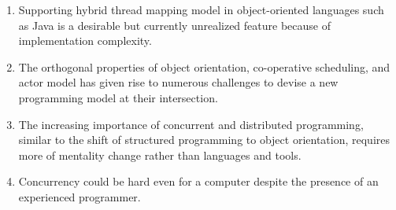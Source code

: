 \documentclass[a5paper,10pt]{article}
\begin{document}
\begin{enumerate}
\item Supporting hybrid thread mapping model in object-oriented languages
such as Java is a desirable but currently unrealized feature because of implementation
complexity.

\item The orthogonal properties of object orientation, co-operative scheduling,
and actor model has given rise to numerous challenges to devise a new 
programming model at their intersection.

\item The increasing importance of concurrent and distributed programming,
similar to the shift of structured programming to object orientation,
requires more of mentality change rather than languages and tools.

\item Concurrency could be hard even for a computer despite the presence of an 
experienced programmer.
\end{enumerate} 
 
\end{document}
